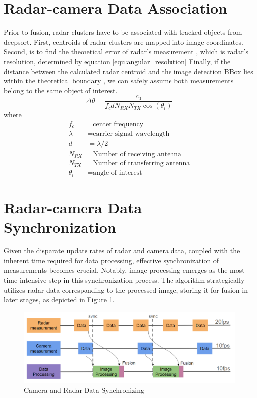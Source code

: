 \section{Radar-camera Data Association}\label{sec:2-association}
Prior to fusion, radar clusters have to be associated with tracked objects from deepsort.
First, centroids of radar clusters are mapped into image coordinates.
Second, is to find the theoretical error of radar's measurement \cite{8844649}, which is radar's resolution, determined by equation \ref*{equ:angular_resolution}
Finally, if the distance between the calculated radar centroid and the image detection BBox lies within the theoretical boundary
, we can safely assume both measurements belong to the same object of interest.
\begin{equation}\label{equ:angular_resolution}
    \Delta \theta= \frac{c_0}{f_c d N_{RX} N_{TX} \cos(\theta _i)}
\end{equation}
where
\begin{align*}
    f_c & = \text{center frequency} \\
    \lambda & = \text{carrier signal wavelength} \\
    d & =  \lambda/2 \\
    N_{RX} & = \text{Number of receiving antenna}\\
    N_{TX}& = \text{Number of transferring antenna}\\
    \theta _i &= \text{angle of interest}
\end{align*}

\section{Radar-camera Data Synchronization}\label{sec:2-sync}
Given the disparate update rates of radar and camera data, 
coupled with the inherent time required for data processing, 
effective synchronization of measurements becomes crucial. 
Notably, image processing emerges as the most time-intensive step in this synchronization process. 
The algorithm strategically utilizes radar data corresponding to the processed image, storing it for fusion in later stages, 
as depicted in Figure \ref{fig:sync_radar_cam}.
\begin{figure}[hpbt]
    \centering
    \includegraphics[width=\textwidth]{Figures/syncing.png}%
    \caption{Camera and Radar Data Synchronizing}
    \label{fig:sync_radar_cam}
\end{figure}





